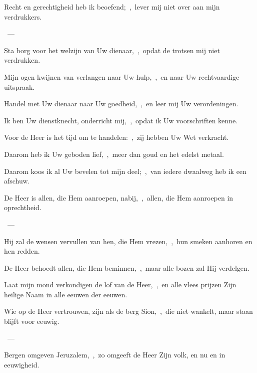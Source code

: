 \documentclass[12pt,twoside,a5paper]{article}
\begin{document}

\begin{halfparskip}
   Recht en gerechtigheid heb ik beoefend;~\sep\ lever mij niet over aan mijn verdrukkers.

  ~--- 

  Sta borg voor het welzijn van Uw dienaar,~\sep\ opdat de trotsen mij niet verdrukken.

  Mijn ogen kwijnen van verlangen naar Uw hulp,~\sep\ en naar Uw rechtvaardige uitspraak.

  Handel met Uw dienaar naar Uw goedheid,~\sep\ en leer mij Uw verordeningen.

  Ik ben Uw dienstknecht, onderricht mij,~\sep\ opdat ik Uw voorschriften kenne.

  Voor de Heer is het tijd om te handelen:~\sep\ zij hebben Uw Wet verkracht.

  Daarom heb ik Uw geboden lief,~\sep\ meer dan goud en het edelst metaal.

  Daarom koos ik al Uw bevelen tot mijn deel;~\sep\ van iedere dwaalweg heb ik een afschuw.
\end{halfparskip}


\begin{halfparskip}
   De Heer is allen, die Hem aanroepen, nabij,~\sep\ allen, die Hem aanroepen in oprechtheid.

  ~--- 

  Hij zal de wensen vervullen van hen, die Hem vrezen,~\sep\ hun smeken aanhoren en hen redden.

  De Heer behoedt allen, die Hem beminnen,~\sep\ maar alle bozen zal Hij verdelgen.

  Laat mijn mond verkondigen de lof van de Heer,~\sep\ en alle vlees prijzen Zijn heilige Naam in alle eeuwen der eeuwen.
\end{halfparskip}


\begin{halfparskip}
   Wie op de Heer vertrouwen, zijn als de berg Sion,~\sep\ die niet wankelt, maar staan blijft voor eeuwig.

  ~--- 

  Bergen omgeven Jeruzalem,~\sep\ zo omgeeft de Heer Zijn volk, en nu en in eeuwigheid.
\end{halfparskip}
\end{document}
